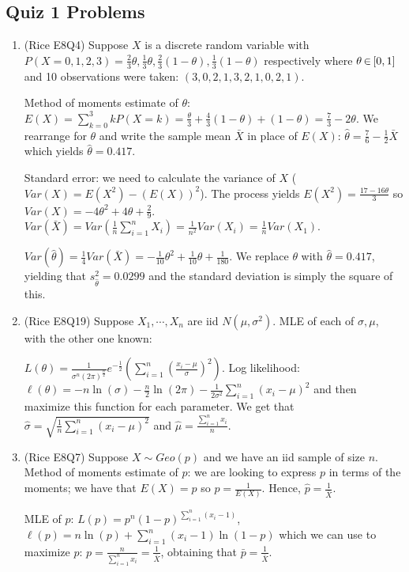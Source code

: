 \documentclass[letterpaper, 8pt]{extarticle}
\begin{document}
\begin{multicols*}{3}
	\section{Quiz 1 Problems}
	\begin{enumerate}[label=\alph*), wide, labelwidth=0pt, labelindent=0pt]
		\item (Rice E8Q4) Suppose $X$ is a discrete random variable with $P(X=0,1,2,3)=\frac{2}{3}\theta,\frac{1}{3}\theta,\frac{2}{3}(1-\theta),\frac{1}{3}(1-\theta)$ respectively where $\theta\,{\in}\,[0,1]$ and 10 observations were taken: $(3,0,2,1,3,2,1,0,2,1)$. 
		
		Method of moments estimate of $\theta$: $E(X)=\sum_{k=0}^3kP(X=k)=\frac{\theta}{3}+\frac{4}{3}(1-\theta)+(1-\theta)=\frac{7}{3}-2\theta$. We rearrange for $\theta$ and write the sample mean $\bar X$ in place of $E(X)$: $\hat\theta=\frac{7}{6}-\frac{1}{2}\bar X$ which yields $\hat\theta=0.417$.
		
		Standard error: we need to calculate the variance of $X$ ($Var(X)=E(X^2)-(E(X))^2$). The process yields $E(X^2)=\frac{17-16\theta}{3}$ so $Var(X)=-4\theta^2+4\theta+\frac{2}{9}$. $Var(\bar X)=Var(\frac{1}{n}\sum_{i=1}^nX_i)=\frac{1}{n^2}Var(X_i)=\frac{1}{n}Var(X_1)$. 
		
		$Var(\hat\theta)=\frac{1}{4}Var(\bar X)=-\frac{1}{10}\theta^2+\frac{1}{10}\theta+\frac{1}{180}$. We replace $\theta$ with $\hat\theta=0.417$, yielding that $s_{\hat\theta}^2=0.0299$ and the standard deviation is simply the square of this.
		
		\item (Rice E8Q19) Suppose $X_1,\cdots,X_n$ are iid $N(\mu, \sigma^2)$. MLE of each of $\sigma,\mu$, with the other one known: 
		
		$L(\theta)=\frac{1}{\sigma^n(2\pi)^\frac{n}{2}}e^{-\frac{1}{2}}\left(\sum_{i=1}^n\left(\frac{x_i-\mu}{\sigma}\right)^2\right)$. Log likelihood: $\ell(\theta)=-n\ln(\sigma)-\frac{n}{2}\ln(2\pi)-\frac{1}{2\sigma^2}\sum_{i=1}^n(x_i-\mu)^2$ and then maximize this function for each parameter. We get that $\hat\sigma=\sqrt{\frac{1}{n}\sum_{i=1}^n(x_i-\mu)^2}$ and $\hat\mu=\frac{\sum_{i=1}^nx_i}{n}$.
		
		\item (Rice E8Q7) Suppose $X\sim Geo(p)$ and we have an iid sample of size $n$. Method of moments estimate of $p$: we are looking to express $p$ in terms of the moments; we have that $E(X)=p$ so $p=\frac{1}{E(X)}$. Hence, $\hat p=\frac{1}{\bar X}$.
		
		MLE of $p$: $L(p)=p^n(1-p)^{\sum_{i=1}^n(x_i-1)}$, $\ell(p)=n\ln(p)+\sum_{i=1}^n(x_i-1)\ln(1-p)$ which we can use to maximize $p$: $p=\frac{n}{\sum_{i=1}^nx_i}=\frac{1}{\bar X}$, obtaining that $\bar p=\frac{1}{\bar X}$.
		

\end{enumerate}
\end{multicols*}
\end{document}
